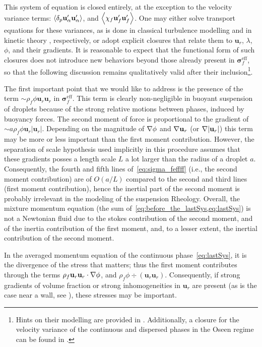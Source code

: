 This system of equation is closed entirely, at the exception to the velocity variance terms: $\left<\delta_{p} \textbf{u}_\alpha'\textbf{u}_\alpha'\right>$, and $\left<\chi_f \textbf{u}_f'\textbf{u}_f'\right>$.
One may either solve transport equations for these variances, as is done in classical turbulence modelling \citep{pope2001turbulent} and in kinetic theory \citep{rao2008introduction}, respectively, or adopt explicit closures that relate them to $\textbf{u}_r$, $\lambda$, $\phi$, and their gradients. 
It is reasonable to expect that the functional form of such closures does not introduce new behaviors beyond those already present in $\bm{\sigma}_f^\text{eff}$, so that the following discussion remains qualitatively valid after their inclusion\footnote{
    Hints on their modelling are provided in \citet{fintzi2025averaged}. 
    Additionally, a closure for the velocity variance of the continuous and dispersed phases in the Oseen regime can be found in \citet{koch1993hydrodynamic}. 
}.


The first important point that we would like to address is the presence of the term $\sim \rho_f \phi  \textbf{u}_r\textbf{u}_r$ in $\bm\sigma_f^\text{eff}$. 
This term is clearly non-negligible in buoyant suspension of droplets because of the strong relative motions between phases, induced by buoyancy forces.  
The second moment of force is proportional to the gradient of $\sim a \rho_f \phi  \textbf{u}_r|\textbf{u}_r|$. 
Depending on the magnitude of $\mathbf{\nabla} \phi$ and $\mathbf{\nabla} \textbf{u}_r$ (or $\mathbf{\nabla} |\textbf{u}_r|$) this term may be more or less important than the first moment contribution. 
However, the separation of scale hypothesis used implicitly in this procedure assumes that these gradients posses a length scale $L$ a lot larger than the radius of a droplet $a$. 
Consequently, the fourth and fifth lines of~\ref{eq:sigma_feffff} (i.e., the second moment contribution) are of $O(a/L)$ compared to the second and third lines (first moment contribution), hence the inertial part of the second moment is probably irrelevant in the modeling of the suspension Rheology. 
Overall, the mixture momentum equation (the sum of~\ref{eq:before_the_lastSys,eq:lastSys}) is not a Newtonian fluid due to the stokes contribution of the second moment, and of the inertia contribution of the first moment, and, to a lesser extent, the inertial contribution of the second moment. 

In the averaged momentum equation of the continuous phase~\eqref{eq:lastSys}, it is the divergence of the stress that matters; thus the first moment contributes through the terms $\rho_f \textbf{u}_r\textbf{u}_r \cdot \mathbf{\nabla} \phi$, and $\rho_f\phi  \div (\textbf{u}_r \textbf{u}_r)$. 
Consequently, if strong gradients of volume fraction or strong inhomogeneities in $\textbf{u}_r$ are present (as is the case near a wall, see \citet{cox1971suspended}), these stresses may be important.
 

